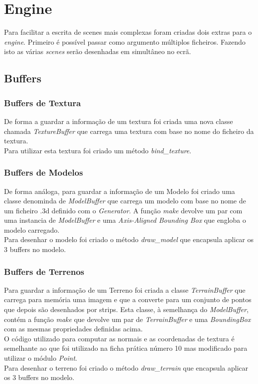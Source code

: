 \documentclass[a4paper]{report}
\begin{document}
\chapter{Engine}
Para facilitar a escrita de scenes mais complexas foram criadas dois extras para
o \textit{engine}. Primeiro é possível passar como argumento múltiplos
ficheiros. Fazendo isto as várias \textit{scenes} serão desenhadas em simultâneo
no ecrã.\\

\section{Buffers}
\subsection{Buffers de Textura}
De forma a guardar a informação de um textura foi criada uma nova classe
chamada \textit{TextureBuffer} que carrega uma textura com base no nome do
ficheiro da textura.\\
Para utilizar esta textura foi criado um método \textit{bind\_texture}.

\subsection{Buffers de Modelos}
De forma análoga, para guardar a informação de um Modelo foi criado uma classe
denominda de \textit{ModelBuffer} que carrega um modelo com base no nome de um
ficheiro .3d definido com o \textit{Generator}. A função \textit{make} devolve
um par com uma instancia de \textit{ModelBuffer} e uma \textit{Axis-Aligned
Bounding Box} que engloba o modelo carregado.\\
Para desenhar o modelo foi criado o método \textit{draw\_model} que encapsula
aplicar os 3 buffers no modelo.\\

\subsection{Buffers de Terrenos}
Para guardar a informação de um Terreno foi criada a classe
\textit{TerrainBuffer} que carrega para memória uma imagem e que a converte para
um conjunto de pontos que depois são desenhados por strips. Esta classe, à
semelhança do \textit{ModelBuffer}, contém a função \textit{make} que devolve um
par de \textit{TerrainBuffer} e uma \textit{BoundingBox} com as mesmas
propriedades definidas acima.\\
O código utilizado para computar as normais e as coordenadas de textura é
semelhante ao que foi utilizado na ficha prática número 10 mas modificado para
utilizar o módulo \textit{Point}.\\
Para desenhar o terreno foi criado o método \textit{draw\_terrain} que encapsula
aplicar os 3 buffers no modelo.\\
\end{document}

